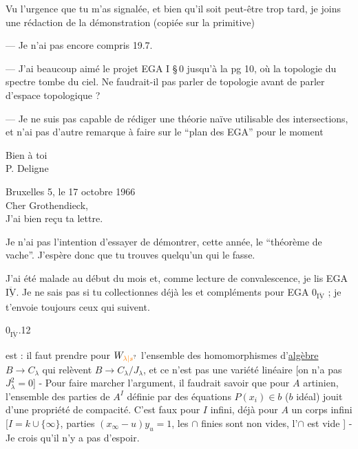 Vu l'urgence que tu m'as signalée, et bien qu'il soit peut-être trop tard, je joins une rédaction de la démonstration (copiée sur la primitive)

--- Je n'ai pas encore compris 19.7.

--- J'ai beaucoup aimé le projet EGA I \S\,0 jusqu'à la pg 10, où la topologie du spectre tombe du ciel. Ne faudrait-il pas parler de topologie avant de parler d'espace topologique ?

--- Je ne suis pas capable de rédiger une théorie naïve utilisable des intersections, et n'ai pas d'autre remarque à faire sur le ``plan des EGA'' pour le moment

Bien à toi\\

P. Deligne\\

Bruxelles 5, le 17 octobre 1966\\

Cher Grothendieck,\\

J'ai bien reçu ta lettre.

Je n'ai pas l'intention d'essayer de démontrer, cette année, le ``théorème de  vache''. J'espère donc que tu trouves quelqu'un qui le fasse.

J'ai été malade au début du mois et, comme lecture de convalescence, je lis EGA $\overline{\underline{\mathrm{IV}}}$. Je ne sais pas si tu collectionnes déjà les  et compléments pour EGA $0_{\overline{\underline{\mathrm{IV}}}}$ ; je t'envoie toujours ceux qui suivent.

$0_{\overline{\underline{\mathrm{IV}}}}$.12


est  : il faut prendre pour $W_{\unsure{\lambda|s}}$ l'ensemble des homomorphismes d'\uline{algèbre} $B\longrightarrow C_\lambda$ qui relèvent $B\longrightarrow C_\lambda/J_\lambda$, et ce n'est pas une variété linéaire [on n'a pas $J_\lambda^2=0$] - Pour faire marcher l'argument, il faudrait savoir que pour $A$ artinien, l'ensemble des parties de $A^I$ définie par  des équations $P(x_i)\in b$ ($b$ idéal) jouit d'une propriété de compacité. C'est faux pour $I$ infini, déjà pour $A$ un corps infini [$I=k\cup\{\infty\}$, parties $(x_\infty-u)y_u=1$, les $\cap$ finies sont non vides, l'$\cap$ est vide ] - Je crois qu'il n'y a pas d'espoir.

